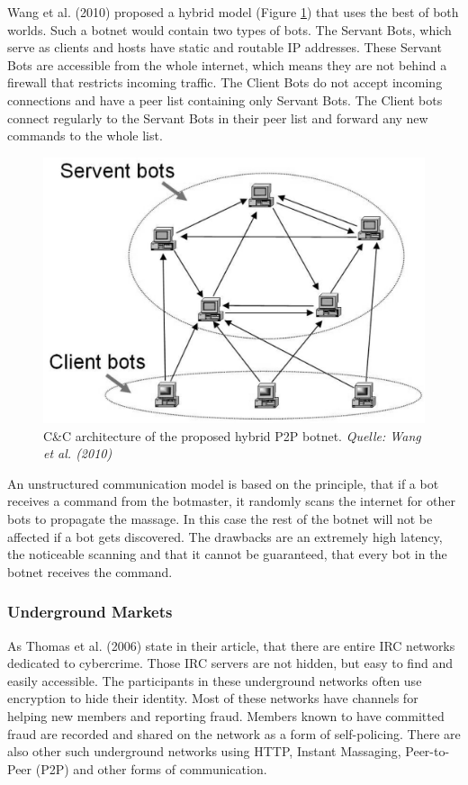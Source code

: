 Wang et al. (2010) proposed a hybrid model (Figure \ref{fig:hybrid}) that uses the best of both worlds. Such a botnet would contain two types of bots. The Servant Bots, which serve as clients and hosts have static and routable IP addresses. These Servant Bots are accessible from the whole internet, which means they are not behind a firewall that restricts incoming traffic. The Client Bots do not accept incoming connections and have a peer list containing only Servant Bots. The Client bots connect regularly to the Servant Bots in their peer list and forward any new commands to the whole list. \cite{Wang10}

\begin{figure}[ht]
\begin{center} \includegraphics[scale=0.3]{Talk11/CC-hybrid} \end{center}
\caption{C\&C architecture of the proposed hybrid P2P botnet. \textit{Quelle: Wang et al. (2010)}}
\label{fig:hybrid}
\end{figure}

An unstructured communication model is based on the principle, that if a bot receives a command from the botmaster, it randomly scans the internet for other bots to propagate the massage. In this case the rest of the botnet will not be affected if a bot gets discovered. The drawbacks are an extremely high latency, the noticeable scanning and that it cannot be guaranteed, that every bot in the botnet receives the command. \cite{Cooke05}

		\subsubsection{Underground Markets}
As Thomas et al. (2006) state in their article, that there are entire IRC networks dedicated to cybercrime. Those IRC servers are not hidden, but easy to find and easily accessible. The participants in these underground networks often use encryption to hide their identity.
Most of these networks have channels for helping new members and reporting fraud. Members known to have committed fraud are recorded and shared on the network as a form of self-policing.
There are also other such underground networks using HTTP, Instant Massaging, Peer-to-Peer (P2P) and other forms of communication. \cite{Thomas06}

